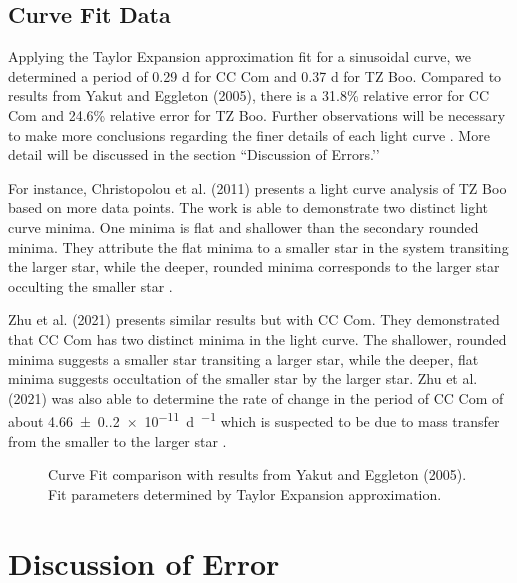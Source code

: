 \documentclass[12pt]{article}
\begin{document}
\subsection{Curve Fit Data}

Applying the Taylor Expansion approximation fit for a sinusoidal curve, we determined a period of 0.29 d for CC Com and 0.37 d for TZ Boo. Compared to results from Yakut and Eggleton (2005), there is a 31.8\% relative error for CC Com and 24.6\% relative error for TZ Boo. Further observations will be necessary to make more conclusions regarding the finer details of each light curve \cite{2011AJ....142...99C}. More detail will be discussed in the section ``Discussion of Errors.’’


For instance, Christopolou et al. (2011) presents a light curve analysis of TZ Boo based on more data points. The work is able to demonstrate two distinct light curve minima. One minima is flat and shallower than the secondary rounded minima. They attribute the flat minima to a smaller star in the system transiting the larger star, while the deeper, rounded minima corresponds to the larger star occulting the smaller star \cite{2011AJ....142...99C}.

Zhu et al. (2021) presents similar results but with CC Com. They demonstrated that CC Com has two distinct minima in the light curve. The shallower, rounded minima suggests a smaller star transiting a larger star, while the deeper, flat minima suggests occultation of the smaller star by the larger star. Zhu et al. (2021) was also able to determine the rate of change in the period of CC Com of about \SI{4.66(0.20)e-11}{\day\per\year} which is suspected to be due to mass transfer from the smaller to the larger star \cite{2021RAA....21...84Z}.

\begin{figure}[htpb]
    \begin{center}
        
    \end{center}
    \caption{}
\end{figure}
\begin{figure}[htpb]
    \begin{center}
        
    \end{center}
    \caption{Curve Fit comparison with results from Yakut and Eggleton (2005). Fit parameters determined by Taylor Expansion approximation.}
\end{figure}

\newpage
\section{Discussion of Error}
\end{document}

